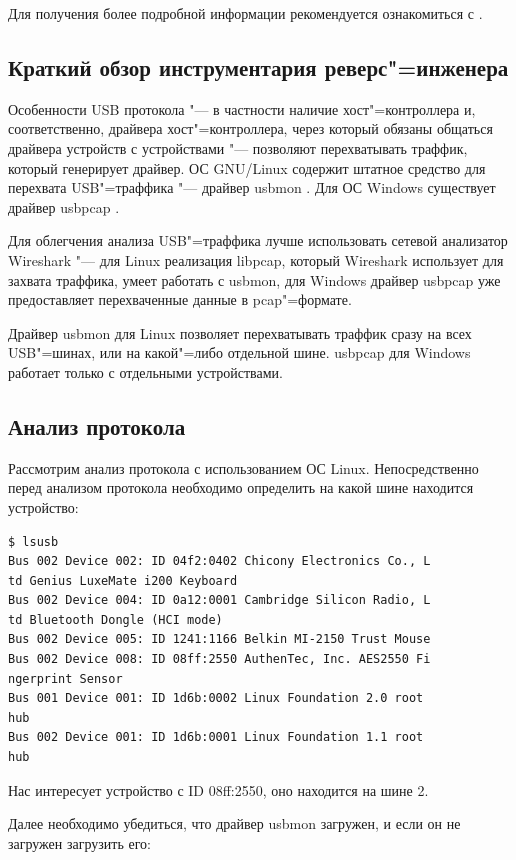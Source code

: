 \documentclass[10pt, a5paper]{article}
\begin{document}
Для получения более подробной информации рекомендуется ознакомиться с \cite{Anar1}.

\subsection*{Краткий обзор инструментария реверс"=инженера}

Особенности USB протокола "--- в частности наличие хост"=контроллера и, соответственно, драйвера хост"=контроллера, через который обязаны общаться драйвера устройств с устройствами "--- позволяют перехватывать траффик, который генерирует драйвер. ОС GNU/Linux содержит штатное средство для перехвата USB"=траффика "--- драйвер usbmon \cite{Anar2}. Для ОС Windows существует драйвер usbpcap \cite{Anar3}.

Для облегчения анализа USB"=траффика лучше использовать сетевой анализатор Wireshark "--- для Linux реализация libpcap, который Wireshark использует для захвата траффика, умеет работать с usbmon, для Windows драйвер usbpcap уже предоставляет перехваченные данные в pcap"=формате.

Драйвер usbmon для Linux позволяет перехватывать траффик сразу на всех USB"=шинах, или на какой"=либо отдельной шине. \linebreak usbpcap для Windows работает только с отдельными устройствами.

\subsection*{Анализ протокола}

Рассмотрим анализ протокола с использованием ОС Linux. Непосредственно перед анализом протокола необходимо определить на какой шине находится устройство:

\begin{verbatim}
$ lsusb
Bus 002 Device 002: ID 04f2:0402 Chicony Electronics Co., L
td Genius LuxeMate i200 Keyboard
Bus 002 Device 004: ID 0a12:0001 Cambridge Silicon Radio, L
td Bluetooth Dongle (HCI mode)
Bus 002 Device 005: ID 1241:1166 Belkin MI-2150 Trust Mouse
Bus 002 Device 008: ID 08ff:2550 AuthenTec, Inc. AES2550 Fi
ngerprint Sensor
Bus 001 Device 001: ID 1d6b:0002 Linux Foundation 2.0 root 
hub
Bus 002 Device 001: ID 1d6b:0001 Linux Foundation 1.1 root 
hub
\end{verbatim}
Нас интересует устройство с ID 08ff:2550, оно находится на шине 2.

Далее необходимо убедиться, что драйвер usbmon загружен, и если он не загружен загрузить его:
\end{document}
